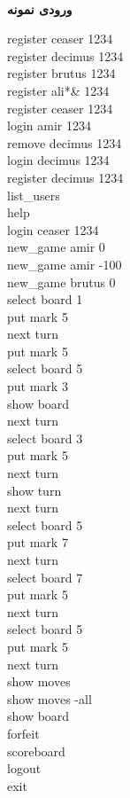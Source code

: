 \documentclass[]{article}
\newcommand{\inputsample}[1]{
    ~\\
    \textbf{ورودی نمونه}
    ~\\
    \begin{tcolorbox}[breakable,boxrule=0pt]
        \begin{latin}
            \large{
                #1
            }
        \end{latin}
    \end{tcolorbox}
}
\begin{document}
\inputsample{
	register ceaser 1234\\
	register decimus 1234\\
	register brutus 1234\\
	register  ali*\& 1234\\
	register ceaser 1234\\
	login amir 1234\\
	remove decimus 1234\\
	login decimus 1234\\
	register decimus 1234\\
	list\_users\\
	help\\
	login ceaser 1234\\
	new\_game amir 0\\
	new\_game amir -100\\
	new\_game brutus 0\\
	select board 1\\
	put mark 5\\
	next turn\\
	put mark 5\\
	select board 5\\
	put mark 3\\
	show board\\
	next turn\\
	select board 3\\
	put mark 5\\
	next turn\\
	show turn\\
	next turn\\
	select board 5\\
	put mark 7\\
	next turn\\
	select board 7\\
	put mark 5\\
	next turn\\
	select board 5\\
	put mark 5\\
	next turn\\
	show moves\\
	show moves -all\\
	show board\\
	forfeit\\
	scoreboard\\
	logout\\
	exit	
}
\end{document}
